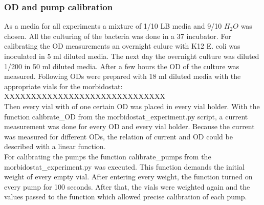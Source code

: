 \subsubsection{OD and pump calibration}
As a media for all experiments a mixture of 1/10 LB media and 9/10 $H_2O$ was chosen. All the culturing of the bacteria was done in a 37 \degree \space incubator.  
For calibrating the OD measurements an overnight culure with K12 E. coli was inoculated in 5 ml diluted media. The next day the overnight culture was diluted 1/200 in 50 ml diluted media. After a few hours the OD of the culture was measured. Following ODs were prepared with 18 ml diluted media with the appropriate vials for the morbidostat: XXXXXXXXXXXXXXXXXXXXXXXXXXXXXX\\
Then every vial with of one certain OD was placed in every vial holder. With the function calibrate\_OD from the morbidostat\_experiment.py script, a current measurement was done for every OD and every vial holder. Because the current was measured for different ODs, the relation of current and OD could be described with a linear function. \\
For calibrating the pumps the function calibrate\_pumps from the morbidostat\_experiment.py was executed. This function demands the initial weight of every empty vial. After entering every weight, the function turned on every pump for 100 seconds. After that, the vials were weighted again and the values passed to the function which allowed precise calibration of each pump.

